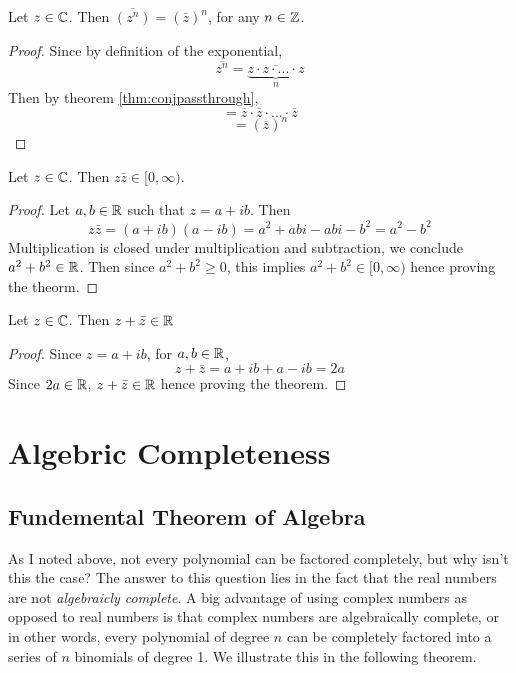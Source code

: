 \begin{cor}
	Let $z\in\mathbb{C}$. Then $\overline{(z^n)}=(\bar{z})^n$, for any $n\in\mathbb{Z}$.\footnotemark
\end{cor}
\begin{proof}
	Since by definition of the exponential,
	$$\overline{z^n}=\underbrace{\overline{z\cdot z\cdot ... \cdot z}}_n$$
	Then by theorem \eqref{thm:conjpassthrough},
	$$=\overline{z}\cdot \overline{z} \cdot ... \cdot \overline{z}$$
	$$=(\overline{z})^n$$
\end{proof}

\begin{theorem}
\label{thm:modsq}
Let $z\in\mathbb{C}$. Then $z\bar z\in[0,\infty)$.	
\end{theorem}
\begin{proof}
	Let $a,b\in\mathbb{R}$ such that $z=a+ib$. Then
	$$z\bar z=(a+ib)(a-ib)=a^2+abi-abi-b^2=a^2-b^2$$
	Multiplication is closed under multiplication and subtraction, we conclude $a^2+b^2\in\mathbb{R}$. Then since $a^2+b^2\ge 0$, this implies $a^2+b^2\in[0,\infty)$ hence proving the theorm.
\end{proof}

\begin{theorem}
\label{thm:addreal}
Let $z\in\mathbb{C}$. Then $z+\bar{z}\in\mathbb{R}$	
\end{theorem}
\begin{proof}
	Since $z=a+ib$, for $a,b\in\mathbb{R}$,
	$$z+\bar z=a+ib+a-ib=2a$$
	Since $2a\in\mathbb{R}$, $z+\bar z\in\mathbb{R}$ hence proving the theorem.
\end{proof}


\section{Algebric Completeness}
\subsection{Fundemental Theorem of Algebra}
As I noted above, not every polynomial can be factored completely, but why isn't this the case?
The answer to this question lies in the fact that the real numbers are not \textit{algebraicly complete}.
A big advantage of using complex numbers as opposed to real numbers is that complex numbers are algebraically complete, or in other words, every polynomial of degree $n$ can be completely factored into a series of $n$ binomials of degree 1. We illustrate this in the following theorem.

